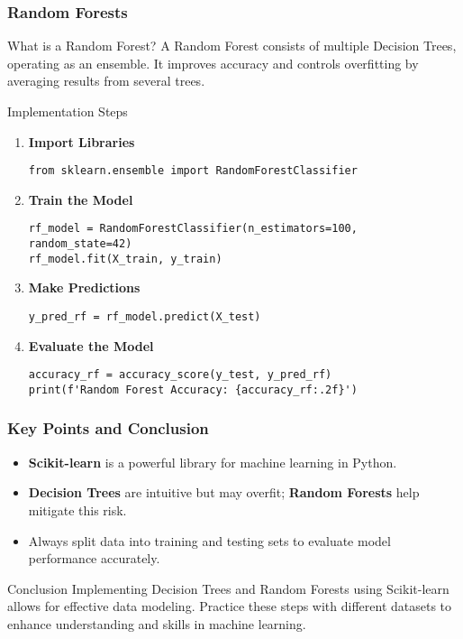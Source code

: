 \documentclass[aspectratio=169]{beamer}
\begin{document}
\begin{frame}[fragile]
    \frametitle{Random Forests}
    \begin{block}{What is a Random Forest?}
        A Random Forest consists of multiple Decision Trees, operating as an ensemble. 
        It improves accuracy and controls overfitting by averaging results from several trees.
    \end{block}

    \begin{block}{Implementation Steps}
        \begin{enumerate}
            \item \textbf{Import Libraries}
            \begin{lstlisting}
from sklearn.ensemble import RandomForestClassifier
            \end{lstlisting}

            \item \textbf{Train the Model}
            \begin{lstlisting}
rf_model = RandomForestClassifier(n_estimators=100, random_state=42)
rf_model.fit(X_train, y_train)
            \end{lstlisting}

            \item \textbf{Make Predictions}
            \begin{lstlisting}
y_pred_rf = rf_model.predict(X_test)
            \end{lstlisting}

            \item \textbf{Evaluate the Model}
            \begin{lstlisting}
accuracy_rf = accuracy_score(y_test, y_pred_rf)
print(f'Random Forest Accuracy: {accuracy_rf:.2f}')
            \end{lstlisting}
        \end{enumerate}
    \end{block}
\end{frame}

\begin{frame}
    \frametitle{Key Points and Conclusion}
    \begin{itemize}
        \item \textbf{Scikit-learn} is a powerful library for machine learning in Python.
        \item \textbf{Decision Trees} are intuitive but may overfit; \textbf{Random Forests} help mitigate this risk.
        \item Always split data into training and testing sets to evaluate model performance accurately.
    \end{itemize}
    
    \begin{block}{Conclusion}
        Implementing Decision Trees and Random Forests using Scikit-learn allows for effective data modeling. 
        Practice these steps with different datasets to enhance understanding and skills in machine learning.
    \end{block}
\end{frame}
\end{document}

